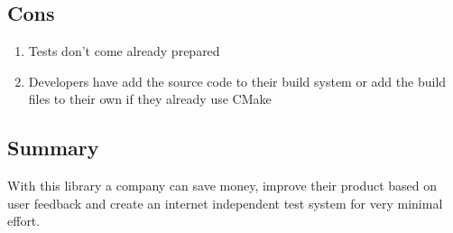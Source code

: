 \subsection{Cons}
\begin{enumerate}
	\item Tests don't come already prepared
	\item Developers have add the source code to their build system or add the build files to their own if they already use CMake
\end{enumerate}
\subsection{Summary}
With this library a company can save money, improve their product based on user feedback and create an internet independent test system for very minimal effort.